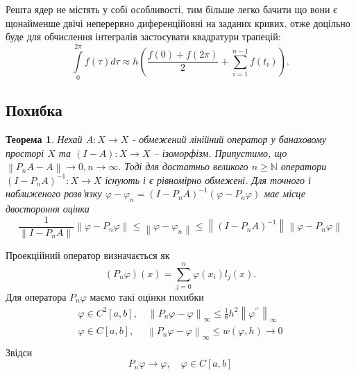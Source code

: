 \documentclass[14pt,a4paper]{extarticle}
\newcounter{e}
\newtheorem{theorem}{Теорема}[section]
\numberwithin{equation}{section}
\numberwithin{figure}{section}
\newcommand{\intl}{\int\limits}
\newcommand{\inttwopi}{\intl_{0}^{2\pi}}
\begin{document}
 Решта ядер не містять у собі особливості, тим більше легко бачити що вони є щонайменше двічі неперервно диференційовні на заданих кривих, отже доцільно буде для обчислення інтегралів застосувати квадратури трапецій:
 \begin{equation}
 	\displaystyle
 	\inttwopi f(\tau) d \tau \approx h \left(\frac{f(0)+f(2\pi)}{2}+\sum_{i=1}^{n-1} f\left(t_{i}\right)\right).
 \end{equation}
 
 
 \subsection{Похибка}
 
\begin{theorem}
	\label{collocation-error}
	Нехай $A: X \rightarrow X$ - обмежений лінійний оператор у банаховому просторі $X$ та $ (I-A):X \rightarrow X$ -- ізоморфізм. Припустимо, що $\left\|P_{n} A-A\right\| \rightarrow 0, n \rightarrow \infty .$ Тоді для достатньо великого $n \geq \mathbb{N}$ оператори $\left(I-P_{n} A\right)^{-1}: X \rightarrow X$ існують і є рівномірно обмежені. Для точного і наближеного розв'язку $\varphi-\varphi_{n}=\left(I-P_{n} A\right)^{-1}\left(\varphi-P_{n} \varphi\right)$ має місце двостороння оцінка
 \begin{equation}
	 \frac{1}{\left\|I-P_{n} A\right\|}\left\|\varphi-P_{n} \varphi\right\| \leq\left\|\varphi-\varphi_{n}\right\| \leq\left\|\left(I-P_{n} A\right)^{-1}\right\|\left\|\varphi-P_{n} \varphi\right\|
 \end{equation}
\end{theorem} 
Проекційний оператор визначається як
\begin{equation}
 \left(P_{n} \varphi\right)(x)= \sum_{j=0}^{n} \varphi\left(x_{i}\right) l_{j}(x) .
\end{equation}
 Для оператора $P_{n} \varphi$ маємо такі оцінки похибки
 $$
 \begin{array}{l}
 	\displaystyle
	\varphi \in C^{2}[a, b], \quad \left\|P_{n} \varphi-\varphi\right\|_{\infty} \leq \frac{1}{8} h^{2}\left\|\varphi^{\prime \prime}\right\|_{\infty}  
	\\[0.3cm]
 	
 	\displaystyle
	\varphi \in C[a, b], \quad \; \left\|P_{n} \varphi-\varphi\right\|_{\infty} \leq w(\varphi, h) \rightarrow 0
	\\[0.3cm]	
\end{array}
 $$
 Звідси 
 $$ 
 P_{n} \varphi \rightarrow \varphi,  \quad  \varphi \in C[a, b]
 $$
 
\end{document}
